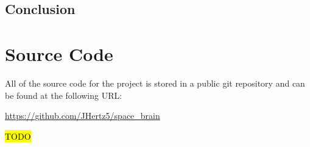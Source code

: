 \documentclass[12pt]{article}
\begin{document}
\subsection{Conclusion}
\label{sec:Conclusion - C}

\newpage



\nocite{*}

\newpage

\appendix
\section{Source Code}
\label{Source}

All of the source code for the project is stored in a public git repository and can be found at the following URL:

\url{https://github.com/JHertz5/space_brain}


\hl{TODO}
\end{document}
